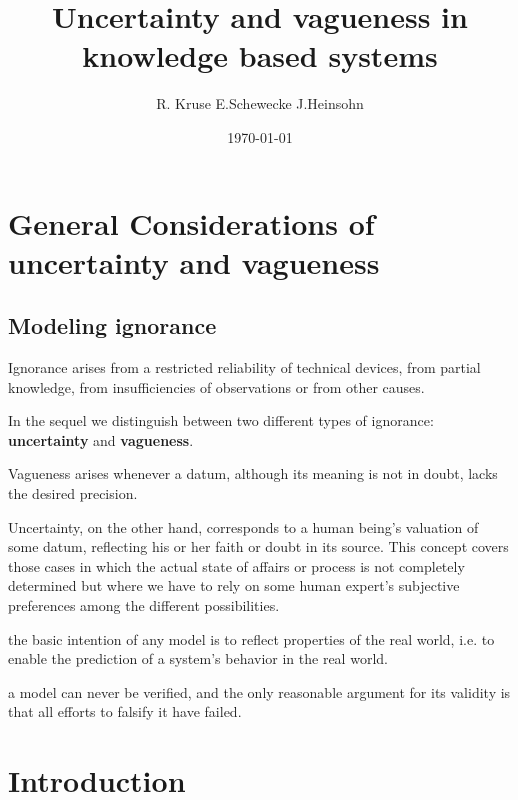 \documentclass[11pt]{article}
\author{R. Kruse E.Schewecke J.Heinsohn}
\date{\today}
\title{Uncertainty and vagueness in knowledge based systems}
\begin{document}
\maketitle
\tableofcontents \clearpage\section{General Considerations of uncertainty and vagueness}
\label{sec:orga084906}
\subsection{Modeling ignorance}
\label{sec:org0b45b23}
Ignorance arises from a restricted reliability of technical devices, from
partial knowledge, from insufficiencies of observations or from other causes. 

In the sequel we distinguish between two different types of ignorance:
\textbf{uncertainty} and \textbf{vagueness}.  

Vagueness arises whenever a datum, although its meaning is not in doubt,
lacks the desired precision. 

Uncertainty, on the other hand, corresponds to a
human being's valuation of some datum, reflecting his or her faith or doubt
in its source. This concept covers those cases in which the actual state of
affairs or process is not completely determined but where we have to rely on
some human expert's subjective preferences among the different possibilities. 

the basic intention of any model is to reflect properties of the real world,
i.e. to enable the prediction of a system's behavior in the real world. 

a model can never be verified, and the only reasonable argument for its
validity is that all efforts to falsify it have failed.
\section{Introduction}
\label{sec:org249483b}
\end{document}

